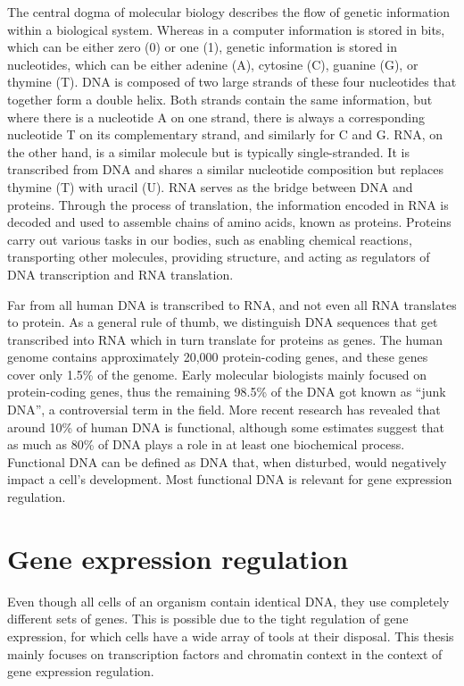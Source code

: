 The central dogma of molecular biology describes the flow of genetic information within a biological system. Whereas in a computer information is stored in bits, which can be either zero (0) or one (1), genetic information is stored in nucleotides, which can be either adenine (A), cytosine (C), guanine (G), or thymine (T). DNA is composed of two large strands of these four nucleotides that together form a double helix. Both strands contain the same information, but where there is a nucleotide A on one strand, there is always a corresponding nucleotide T on its complementary strand, and similarly for C and G. RNA, on the other hand, is a similar molecule but is typically single-stranded. It is transcribed from DNA and shares a similar nucleotide composition but replaces thymine (T) with uracil (U). RNA serves as the bridge between DNA and proteins. Through the process of translation, the information encoded in RNA is decoded and used to assemble chains of amino acids, known as proteins. Proteins carry out various tasks in our bodies, such as enabling chemical reactions, transporting other molecules, providing structure, and acting as regulators of DNA transcription and RNA translation.

Far from all human DNA is transcribed to RNA, and not even all RNA translates to protein. As a general rule of thumb, we distinguish DNA sequences that get transcribed into RNA which in turn translate for proteins as genes. The human genome contains approximately 20,000 protein-coding genes, and these genes cover only 1.5\% of the genome\cite{Piovesan2019}. Early molecular biologists mainly focused on protein-coding genes, thus the remaining 98.5\% of the DNA got known as ``junk DNA'', a controversial term in the field\cite{Graur2013}. More recent research has revealed that around 10\% of human DNA is functional\cite{Graur2013}, although some estimates suggest that as much as 80\% of DNA plays a role in at least one biochemical process\cite{encode2012}. Functional DNA can be defined as DNA that, when disturbed, would negatively impact a cell's development. Most functional DNA is relevant for gene expression regulation.

\section{Gene expression regulation}

Even though all cells of an organism contain identical DNA, they use completely different sets of genes. This is possible due to the tight regulation of gene expression, for which cells have a wide array of tools at their disposal. This thesis mainly focuses on transcription factors and chromatin context in the context of gene expression regulation.

